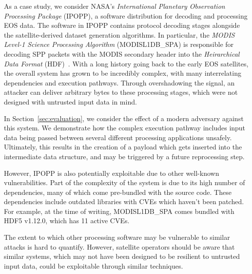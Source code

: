 As a case study, we consider NASA's \textit{International Planetary Observation Processing Package} (IPOPP), a software distribution for decoding and processing EOS data.
The software in IPOPP contains protocol decoding stages alongside the satellite-derived dataset generation algorithms.
In particular, the \textit{MODIS Level-1 Science Processing Algorithm} (MODISL1DB\_SPA) is responsible for decoding SPP packets with the MODIS secondary header into the \textit{Heirarchical Data Format} (HDF)~\cite{modisL1DB}.
With a long history going back to the early EOS satellites, the overall system has grown to be incredibly complex, with many interrelating dependencies and execution pathways.
Through overshadowing the signal, an attacker can deliver arbitrary bytes to these processing stages, which were not designed with untrusted input data in mind.

In Section~\ref{sec:evaluation}, we consider the effect of a modern adversary against this system.
We demonstrate how the complex execution pathway includes input data being passed between several different processing applications unsafely.
Ultimately, this results in the creation of a payload which gets inserted into the intermediate data structure, and may be triggered by a future reprocessing step.

However, IPOPP is also potentially exploitable due to other well-known vulnerabilities.
Part of the complexity of the system is due to its high number of dependencies, many of which come pre-bundled with the source code.
These dependencies include outdated libraries with CVEs which haven't been patched.
For example, at the time of writing, MODISL1DB\_SPA comes bundled with HDF5 v1.12.0, which has 11 active CVEs.



The extent to which other processing software may be vulnerable to similar attacks is hard to quantify.
However, satellite operators should be aware that similar systems, which may not have been designed to be resilient to untrusted input data, could be exploitable through similar techniques.

